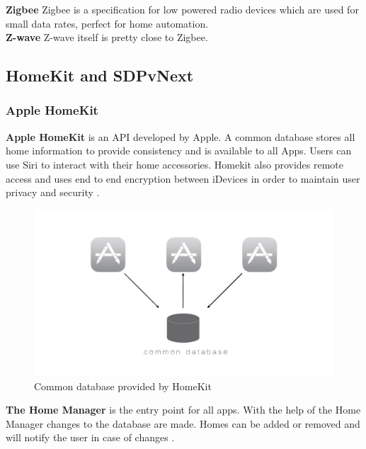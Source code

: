 				\textbf{Zigbee}
					Zigbee is a specification for low powered radio devices which are used for small data rates, perfect for home automation.\\ 

				\textbf{Z-wave}
					Z-wave itself is pretty close to Zigbee.\\

				\pagebreak


	\subsection{HomeKit and SDPvNext}

		\subsubsection{Apple HomeKit}

			\textbf{Apple HomeKit} is an API developed by Apple. A common database stores all home information to provide consistency and is available to all Apps. Users can use Siri to interact with their home accessories. Homekit also provides remote access and uses end to end encryption between iDevices in order to maintain user privacy and security \parencite{IntroToHomeKit}. 

			\begin{figure}[h]
				\centering
					\includegraphics[width=.9\textwidth]{images/theory/Homekit_Database.png}
				\caption{Common database provided by HomeKit \parencite{IntroToHomeKit}}
				\label{fig:Homekit_Database}
			\end{figure}

			\textbf{The Home Manager} is the entry point for all apps. With the help of the Home Manager changes to the database are made. Homes can be added or removed and will notify the user in case of changes \parencite{IntroToHomeKit}.

